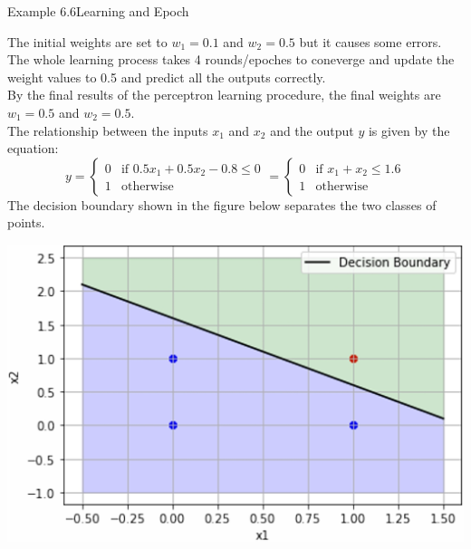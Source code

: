 \documentclass{book}
\begin{document}
\begin{egBox}{Example 6.6}{Learning and Epoch}
    \raggedright
    The initial weights are set to \(w_1 = 0.1\) and \(w_2 = 0.5\) but it causes some errors.\\
    The whole learning process takes 4 rounds/epoches to coneverge and update the weight values to 0.5 and predict all the outputs correctly.\\
    By the final results of the perceptron learning procedure, the final weights are \(w_1 = 0.5\) and \(w_2 = 0.5\).\\
    \vspace{3mm}
    The relationship between the inputs \(x_1\) and \(x_2\) and the output \(y\) is given by the equation:
    \[
        y = \begin{cases}
            0 & \text{if } 0.5x_1 + 0.5x_2 - 0.8 \leq 0\\
            1 & \text{otherwise}
        \end{cases} = \begin{cases}
            0 & \text{if } x_1 + x_2 \leq 1.6\\
            1 & \text{otherwise}
        \end{cases}
    \]
    The decision boundary shown in the figure below separates the two classes of points.\\
    \begin{center}
        \includegraphics[scale=0.3]{chapter 6/ch6_figure8.jpeg}
    \end{center}
\end{egBox}
\\
\end{document}
